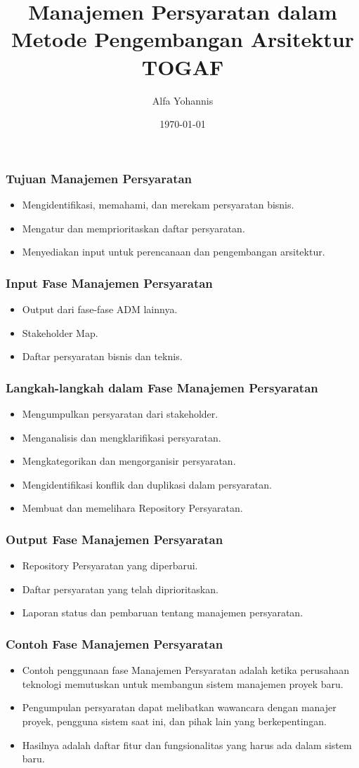 \documentclass{beamer}
\title{Manajemen Persyaratan dalam Metode Pengembangan Arsitektur TOGAF}
\author{Alfa Yohannis}
\date{\today}
\begin{document}
\frame{\titlepage}

\begin{frame}
\frametitle{Tujuan Manajemen Persyaratan}
\begin{itemize}
\item Mengidentifikasi, memahami, dan merekam persyaratan bisnis.
\item Mengatur dan memprioritaskan daftar persyaratan.
\item Menyediakan input untuk perencanaan dan pengembangan arsitektur.
\end{itemize}
\end{frame}

\begin{frame}
\frametitle{Input Fase Manajemen Persyaratan}
\begin{itemize}
\item Output dari fase-fase ADM lainnya.
\item Stakeholder Map.
\item Daftar persyaratan bisnis dan teknis.
\end{itemize}
\end{frame}

\begin{frame}
\frametitle{Langkah-langkah dalam Fase Manajemen Persyaratan}
\begin{itemize}
\item Mengumpulkan persyaratan dari stakeholder.
\item Menganalisis dan mengklarifikasi persyaratan.
\item Mengkategorikan dan mengorganisir persyaratan.
\item Mengidentifikasi konflik dan duplikasi dalam persyaratan.
\item Membuat dan memelihara Repository Persyaratan.
\end{itemize}
\end{frame}

\begin{frame}
\frametitle{Output Fase Manajemen Persyaratan}
\begin{itemize}
\item Repository Persyaratan yang diperbarui.
\item Daftar persyaratan yang telah diprioritaskan.
\item Laporan status dan pembaruan tentang manajemen persyaratan.
\end{itemize}
\end{frame}

\begin{frame}
\frametitle{Contoh Fase Manajemen Persyaratan}
\begin{itemize}
\item Contoh penggunaan fase Manajemen Persyaratan adalah ketika perusahaan teknologi memutuskan untuk membangun sistem manajemen proyek baru.
\item Pengumpulan persyaratan dapat melibatkan wawancara dengan manajer proyek, pengguna sistem saat ini, dan pihak lain yang berkepentingan.
\item Hasilnya adalah daftar fitur dan fungsionalitas yang harus ada dalam sistem baru.
\end{itemize}
\end{frame}
\end{document}
